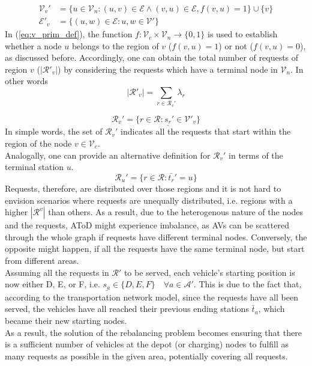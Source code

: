 \begin{align}
\mathcal{V}_v' &= \{ u \in \mathcal{V}_n : (u, v) \in \mathcal{E} \wedge (v, u) \in \mathcal{E} , f(v,u) = 1 \} \cup \{ v\} \label{eq:v_prim_def}\\
\mathcal{E}'_v &= \{ (u, w) \in \mathcal{E} : u, w \in \mathcal{V}' \} 
\end{align}
In (\ref{eq:v_prim_def}), the function $f :  \mathcal{V}_c \times \mathcal{V}_n \rightarrow \{0,1\}$ is used to establish whether a node $u$ belongs to the region of $v$ ($f(v,u) = 1$) or not ($f(v,u) = 0$), as discussed before. Accordingly, one can obtain the total number of requests of region $v$ ($|\mathcal{R}'_v|$) by considering the requests which have a terminal node in $\mathcal{V}_n$. In other words
\begin{equation}
|\mathcal{R}'_v| = \sum_{r \in \mathcal{R}_v'} \lambda_r
\end{equation}

\begin{equation}
\mathcal{R}_v'= \{ r \in \mathcal{R} : \underline{s_r}' \in \mathcal{V'}_v \} \label{eq:req_per_reg}
\end{equation}
In simple words, the set of $\mathcal{R}_v'$ indicates all the requests that start within the region of the node $v \in \mathcal{V}_c$. \\
Analogally, one can provide an alternative definition for $\mathcal{R}_v'$ in terms of the terminal station $u$.
\begin{equation}
	\mathcal{R}_u'= \{ r \in \mathcal{R} : \bar{t_r}' = u \}%
\end{equation}
Requests, therefore, are distributed over those regions and it is not hard to envision scenarios where requests are unequally distributed, i.e. regions with a higher $|\mathcal{R}^v| $ than others. As a result, due to the heterogenous nature of the nodes and the requests, AToD might experience imbalance, as AVs can be scattered through the whole graph if requests have different terminal nodes. Conversely, the opposite might happen, if all the requests have the same terminal node, but start from different areas. \\ 
Assuming all the requests in $\mathcal{R}'$ to be served, each vehicle's starting position is now either D, E, or F, i.e. $\underline{s_a} \in \{D, E, F\} \quad \forall a \in \mathcal{A}'$. This is due to the fact that, according to the transportation network model, since the requests have all been served, the vehicles have all reached their previous ending stations $\bar{t}_a$, which became their new starting nodes. \\
As a result, the solution of the rebalancing problem becomes ensuring that there is a sufficient number of vehicles at the depot (or charging) nodes to fulfill as many requests as possible in the given area, potentially covering all requests.

